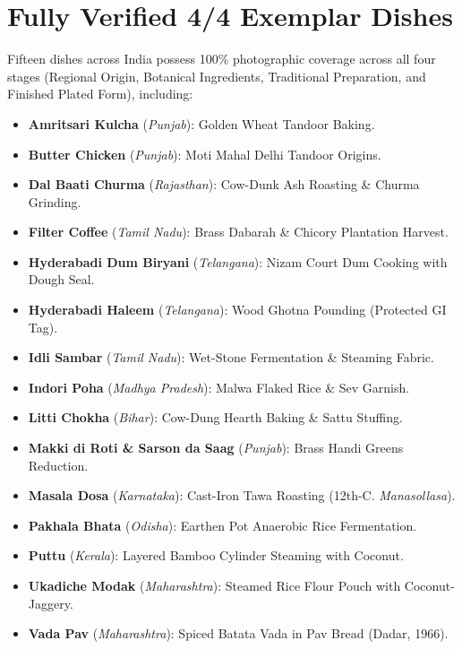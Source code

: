 \documentclass[11pt,a4paper]{report}
\begin{document}
\section{Fully Verified 4/4 Exemplar Dishes}
Fifteen dishes across India possess 100\% photographic coverage across all four stages (Regional Origin, Botanical Ingredients, Traditional Preparation, and Finished Plated Form), including:
\begin{itemize}
    \item \textbf{Amritsari Kulcha} (\emph{Punjab}): Golden Wheat Tandoor Baking.
    \item \textbf{Butter Chicken} (\emph{Punjab}): Moti Mahal Delhi Tandoor Origins.
    \item \textbf{Dal Baati Churma} (\emph{Rajasthan}): Cow-Dunk Ash Roasting \& Churma Grinding.
    \item \textbf{Filter Coffee} (\emph{Tamil Nadu}): Brass Dabarah \& Chicory Plantation Harvest.
    \item \textbf{Hyderabadi Dum Biryani} (\emph{Telangana}): Nizam Court Dum Cooking with Dough Seal.
    \item \textbf{Hyderabadi Haleem} (\emph{Telangana}): Wood Ghotna Pounding (Protected GI Tag).
    \item \textbf{Idli Sambar} (\emph{Tamil Nadu}): Wet-Stone Fermentation \& Steaming Fabric.
    \item \textbf{Indori Poha} (\emph{Madhya Pradesh}): Malwa Flaked Rice \& Sev Garnish.
    \item \textbf{Litti Chokha} (\emph{Bihar}): Cow-Dung Hearth Baking \& Sattu Stuffing.
    \item \textbf{Makki di Roti \& Sarson da Saag} (\emph{Punjab}): Brass Handi Greens Reduction.
    \item \textbf{Masala Dosa} (\emph{Karnataka}): Cast-Iron Tawa Roasting (12th-C. \emph{Manasollasa}).
    \item \textbf{Pakhala Bhata} (\emph{Odisha}): Earthen Pot Anaerobic Rice Fermentation.
    \item \textbf{Puttu} (\emph{Kerala}): Layered Bamboo Cylinder Steaming with Coconut.
    \item \textbf{Ukadiche Modak} (\emph{Maharashtra}): Steamed Rice Flour Pouch with Coconut-Jaggery.
    \item \textbf{Vada Pav} (\emph{Maharashtra}): Spiced Batata Vada in Pav Bread (Dadar, 1966).
\end{itemize}

\end{document}
